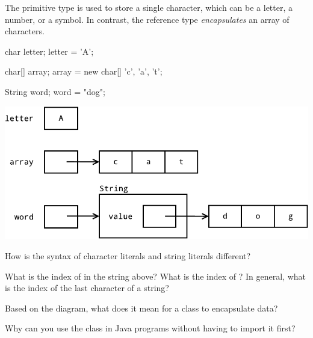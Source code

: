 
The primitive type  is used to store a single character, which can be a letter, a number, or a symbol.
In contrast, the reference type  \emph{encapsulates} an array of characters.

\begin{minipage}[t]{150pt}
\begin{javalst}
char letter;
letter = 'A';

char[] array;
array = new char[]
        {'c', 'a', 't'};

String word;
word = "dog";
\end{javalst}
\end{minipage}
\hfill
\begin{minipage}[t]{345pt}
\null
\includegraphics[width=\linewidth]{CS1/string1.pdf}
\null
\end{minipage}




\Q How is the syntax of character literals and string literals different?

\begin{answer}
\end{answer}


\Q What is the index of  in the string above?
What is the index of ?
In general, what is the index of the last character of a string?

\begin{answer}
\end{answer}


\Q Based on the diagram, what does it mean for a class to encapsulate data?

\begin{answer}
\end{answer}


\Q Why can you use the  class in Java programs without having to import it first?

